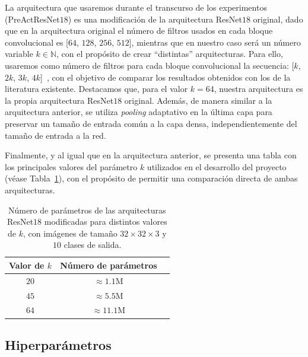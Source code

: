 La arquitectura que usaremos durante el transcurso de los experimentos (PreActResNet$18$) es una modificación de la arquitectura ResNet$18$ original, dado que en la arquitectura original el número de filtros usados en cada bloque convolucional es [$64$, $128$, $256$, $512$], mientras que en nuestro caso será un número variable $k \in \mathbb{N}$, con el propósito de crear ``distintas'' arquitecturas. Para ello, usaremos como número de filtros para cada bloque convolucional la secuencia: [$k$, $2k$, $3k$, $4k$]~\cite{Nakkiran2019}, con el objetivo de comparar los resultados obtenidos con los de la literatura existente. Destacamos que, para el valor $k=64$, nuestra arquitectura es la propia arquitectura ResNet$18$ original. Además, de manera similar a la arquitectura anterior, se utiliza \textit{pooling} adaptativo en la última capa para preservar un tamaño de entrada común a la capa densa, independientemente del tamaño de entrada a la red.

Finalmente, y al igual que en la arquitectura anterior, se presenta una tabla con los principales valores del parámetro $k$ utilizados en el desarrollo del proyecto (véase Tabla~\ref{tab:numero-parametrosresnet}), con el propósito de permitir una comparación directa de ambas arquitecturas.

\begin{table}[ht]
    \centering
    \begin{tabular}{|c|c|c|}
    \hline
    \textbf{Valor de $k$}           & \textbf{Número de parámetros}                     
    \\ \hline
    $20$                  & $\approx 1.1$\space M                                            \\ \hline
    $45$                  & $\approx 5.5$\space M                                             \\ \hline
    $64$                  & $\approx 11.1$\space M                                             \\ \hline
    \end{tabular}
    \caption[Número de parámetros de las arquitecturas ResNet$18$ modificadas.]{Número de parámetros de las arquitecturas ResNet$18$ modificadas para distintos valores de $k$, con imágenes de tamaño $32 \times 32 \times 3$ y $10$ clases de salida.
}\label{tab:numero-parametrosresnet}
\end{table}

\subsection{Hiperparámetros}\label{subsec:hiperparametros}

